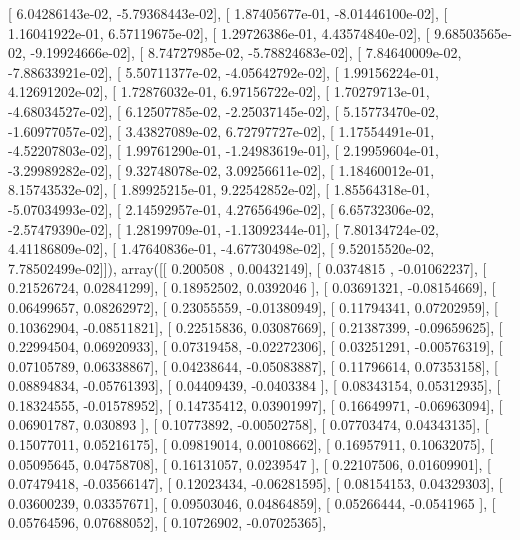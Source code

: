 \documentclass{article}
\begin{document}
       [  6.04286143e-02,  -5.79368443e-02],
       [  1.87405677e-01,  -8.01446100e-02],
       [  1.16041922e-01,   6.57119675e-02],
       [  1.29726386e-01,   4.43574840e-02],
       [  9.68503565e-02,  -9.19924666e-02],
       [  8.74727985e-02,  -5.78824683e-02],
       [  7.84640009e-02,  -7.88633921e-02],
       [  5.50711377e-02,  -4.05642792e-02],
       [  1.99156224e-01,   4.12691202e-02],
       [  1.72876032e-01,   6.97156722e-02],
       [  1.70279713e-01,  -4.68034527e-02],
       [  6.12507785e-02,  -2.25037145e-02],
       [  5.15773470e-02,  -1.60977057e-02],
       [  3.43827089e-02,   6.72797727e-02],
       [  1.17554491e-01,  -4.52207803e-02],
       [  1.99761290e-01,  -1.24983619e-01],
       [  2.19959604e-01,  -3.29989282e-02],
       [  9.32748078e-02,   3.09256611e-02],
       [  1.18460012e-01,   8.15743532e-02],
       [  1.89925215e-01,   9.22542852e-02],
       [  1.85564318e-01,  -5.07034993e-02],
       [  2.14592957e-01,   4.27656496e-02],
       [  6.65732306e-02,  -2.57479390e-02],
       [  1.28199709e-01,  -1.13092344e-01],
       [  7.80134724e-02,   4.41186809e-02],
       [  1.47640836e-01,  -4.67730498e-02],
       [  9.52015520e-02,   7.78502499e-02]]), array([[ 0.200508  ,  0.00432149],
       [ 0.0374815 , -0.01062237],
       [ 0.21526724,  0.02841299],
       [ 0.18952502,  0.0392046 ],
       [ 0.03691321, -0.08154669],
       [ 0.06499657,  0.08262972],
       [ 0.23055559, -0.01380949],
       [ 0.11794341,  0.07202959],
       [ 0.10362904, -0.08511821],
       [ 0.22515836,  0.03087669],
       [ 0.21387399, -0.09659625],
       [ 0.22994504,  0.06920933],
       [ 0.07319458, -0.02272306],
       [ 0.03251291, -0.00576319],
       [ 0.07105789,  0.06338867],
       [ 0.04238644, -0.05083887],
       [ 0.11796614,  0.07353158],
       [ 0.08894834, -0.05761393],
       [ 0.04409439, -0.0403384 ],
       [ 0.08343154,  0.05312935],
       [ 0.18324555, -0.01578952],
       [ 0.14735412,  0.03901997],
       [ 0.16649971, -0.06963094],
       [ 0.06901787,  0.030893  ],
       [ 0.10773892, -0.00502758],
       [ 0.07703474,  0.04343135],
       [ 0.15077011,  0.05216175],
       [ 0.09819014,  0.00108662],
       [ 0.16957911,  0.10632075],
       [ 0.05095645,  0.04758708],
       [ 0.16131057,  0.0239547 ],
       [ 0.22107506,  0.01609901],
       [ 0.07479418, -0.03566147],
       [ 0.12023434, -0.06281595],
       [ 0.08154153,  0.04329303],
       [ 0.03600239,  0.03357671],
       [ 0.09503046,  0.04864859],
       [ 0.05266444, -0.0541965 ],
       [ 0.05764596,  0.07688052],
       [ 0.10726902, -0.07025365],
\end{document}
